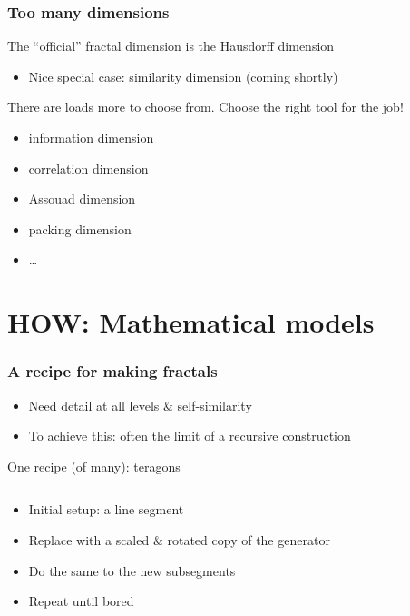 \documentclass[12pt]{beamer}
\def\kochsegment#1#2{--++(#1:#2) -- ++(#1+60:#2) -- ++(#1-60:#2) -- ++(#1:#2)}
\begin{document}
\begin{frame}
\frametitle{Too many dimensions}
The ``official'' fractal dimension is the \alert{Hausdorff dimension}
\pause
\begin{itemize}[<+->]
	\item Nice special case: \alert{similarity dimension} (coming shortly)
\end{itemize}
\pause[\thebeamerpauses]
There are loads more to choose from.
Choose the right tool for the job!
\pause
\begin{itemize}
	\item information dimension
	\item correlation dimension
	\item Assouad dimension
	\item packing dimension
	\item \dots	
\end{itemize}
\end{frame}

\section{HOW: Mathematical models}

\begin{frame}
\frametitle{A recipe for making fractals}
\begin{itemize}
	\item Need detail at all levels \& self-similarity
	\item To achieve this: often the limit of a recursive construction
\end{itemize}
\pause
One recipe (of many): \alert{teragons}
\medskip
\begin{columns}
\begin{column}{0.6\linewidth}
\begin{itemize}[<+->]
	\item \alert{Initial setup:} a line segment
	\item Replace with a scaled \& rotated copy of the \alert{generator}
	\item Do the same to the new subsegments
	\item Repeat until bored
\end{itemize}
\end{column}
\begin{column}{0.4\linewidth}
\centering
\bigskip
{}
\end{column}
\end{columns}
\end{frame}
\end{document}
